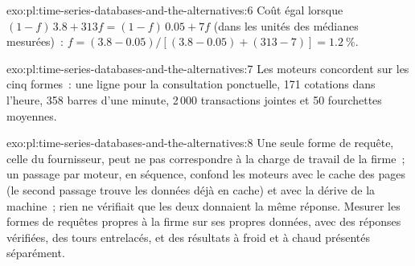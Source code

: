 \begin{solution}{exo:pl:time-series-databases-and-the-alternatives:6}
Coût égal lorsque $(1-f)\,3.8 + 313 f = (1-f)\,0.05 + 7 f$ (dans les unités des médianes mesurées)~: $f = (3.8-0.05)/[(3.8-0.05) +
(313-7)] = 1.2~\%$.
\end{solution}

\begin{solution}{exo:pl:time-series-databases-and-the-alternatives:7}
Les moteurs concordent sur les cinq formes~: une ligne pour la consultation ponctuelle, 171 cotations dans l'heure, 358 barres d'une minute, 2\,000 transactions jointes et
50 fourchettes moyennes.
\end{solution}

\begin{solution}{exo:pl:time-series-databases-and-the-alternatives:8}
Une seule forme de requête, celle du fournisseur, peut ne pas correspondre à la charge de travail de la firme~; un passage par moteur, en séquence, confond les moteurs avec le cache des pages
(le second passage trouve les données déjà en cache) et avec la dérive de la machine~; rien ne vérifiait que les deux donnaient la même réponse. Mesurer les formes de
requêtes propres à la firme sur ses propres données, avec des réponses vérifiées, des tours entrelacés, et des résultats à froid et à chaud présentés séparément.
\end{solution}


